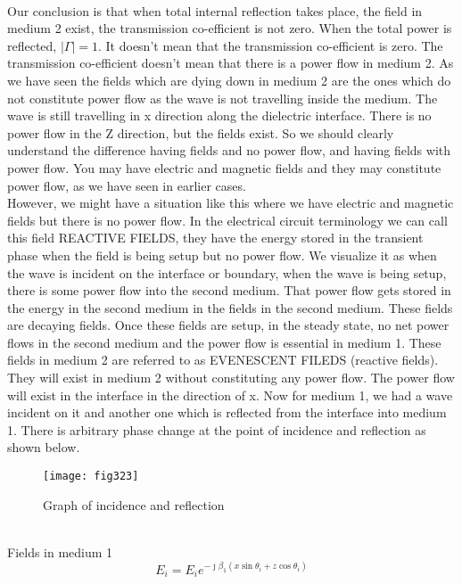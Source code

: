 \paragraph{}Our conclusion is that when total internal reflection takes place, the field in medium 2 exist, the transmission co-efficient is not zero. When the total power is reflected, $|\Gamma| = 1$. It doesn't mean that the transmission co-efficient is zero. The transmission co-efficient doesn't mean that there is a power flow in medium 2. As we have seen the fields which are dying down in medium 2 are the ones which do not constitute power flow as the wave is not travelling inside the medium. The wave is still travelling in x direction along the dielectric interface. There is no power flow in the Z direction, but the fields exist. So we should clearly understand the difference having fields and no power flow, and having fields with power flow. You may have electric and magnetic fields and they may constitute power flow, as we have seen in earlier cases.\\ However, we might have a situation like this where we have electric and magnetic fields but there is no power flow. In the electrical circuit terminology we can call this field REACTIVE FIELDS, they have the energy stored in the transient phase when the field is being setup but no power flow. We visualize it as when the wave is incident on the interface or boundary, when the wave is being setup, there is some power flow into the second medium. That power flow gets stored in the energy in the second medium in the fields in the second medium. These fields are decaying fields. Once these fields are setup, in the steady state, no net power flows in the second medium and the power flow is essential in medium 1. These fields in medium 2 are referred to as EVENESCENT FILEDS (reactive fields). They will exist in medium 2 without constituting any power flow. The power flow will exist in the interface in the direction of x. Now for medium 1, we had a wave incident on it and another one which is reflected from the interface into medium 1. There is arbitrary phase change at the point of incidence and reflection as shown below.
\begin{figure}[h]
	\centering
	\texttt{[image: fig323]}
	\caption{Graph of incidence and reflection}
\end{figure}\\
Fields in medium 1
\begin{equation}
E_i = E_i e^{- \jmath \beta_1(x\sin\theta_i + z\cos\theta_i)}
\end{equation}
